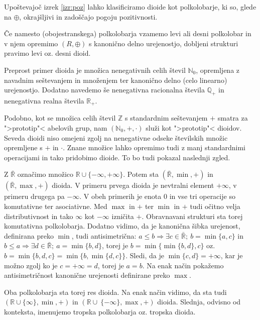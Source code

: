 \documentclass[mat1]{fmfdelo}
\newcommand{\R}{\mathbb{R}}
\newcommand{\N}{\mathbb{N}}
\newcommand{\Z}{\mathbb{Z}}
\newcommand{\No}{\N_0}
\newcommand{\Pplus}[1]{\mathbb{#1}_{+}}
\begin{document}
	Upoštevajoč izrek \ref{izr:poz} lahko klasificiramo dioide kot polkolobarje, ki so, glede na $\oplus$, okrajšljivi in zadoščajo pogoju pozitivnosti.
\begin{opomba}
	Če namesto (obojestranskega) polkolobarja vzamemo levi ali desni polkolobar in v njem opremimo $(R, \oplus)$ s kanonično delno urejenostjo, dobljeni strukturi pravimo levi oz. desni dioid.
\end{opomba}

Preprost primer dioida je množica nenegativnih celih števil $\No$, opremljena z navadnim seštevanjem in množenjem ter kanonično delno (celo linearno) urejenostjo. Dodatno navedemo še nenegativna racionalna števila $\Pplus{Q}$ in nenegativna realna števila $\Pplus{R}$.

Podobno, kot se množica celih števil $\Z$ s standardnim seštevanjem $+$ smatra za ">prototip"< abelovih grup, nam $(\No, +, \cdot)$ služi kot ">prototip"< dioidov. Seveda dioidi niso omejeni zgolj na nenegativne odseke številskih množic opremljene s $+$ in $\cdot$. Znane množice lahko opremimo tudi z manj standardnimi operacijami in tako pridobimo dioide. To bo tudi pokazal naslednji zgled.

\begin{zgled}\label{zgled:tropdioid}
	Z $\bar{\R}$ označimo množico $\R \cup \{-\infty, +\infty\}$. Potem sta $(\bar{\R}, \min, +)$ in $(\bar{\R}, \max, +)$ dioida. V primeru prvega dioida je nevtralni element $+\infty$, v primeru drugega pa $-\infty$. V obeh primerih je enota $0$ in vse tri operacije so komutativne ter asociativne. Med $\max$ in $+$ ter $\min$ in $+$ tudi očitno velja distributivnost in tako $\infty$ kot $-\infty$ izničita $+$. Obravnavani strukturi sta torej komutativna polkolobarja.
	 Dodatno vidimo, da je kanonična šibka urejenost, definirana preko $\min$, tudi antisimetrična: $a\leq b \Rightarrow \exists c\in \bar{\R};~b = \min\{a, c\}$ in $b\leq a \Rightarrow \exists d\in \bar{\R};~a = \min\{b, d\}$, torej je $b = \min\{\min\{b, d\}, c\}$ oz. $b = \min\{b, d, c\} = \min\{b, \min\{d, c\}\}$. Sledi, da je $\min\{c, d\} = +\infty$, kar je možno zgolj ko je $c = +\infty = d$, torej je $a = b$. Na enak način pokažemo antisimetričnost kanonične urejenosti definirane preko $\max$.

	Oba polkolobarja sta torej res dioida. Na enak način vidimo, da sta tudi $(\R\cup\{\infty\}, \min, +)$ in $(\R\cup\ \{-\infty\}, \max, +)$ dioida. Slednja, odvisno od konteksta, imenujemo tropska polkolobarja oz. tropska dioida.
\end{zgled}
\end{document}
